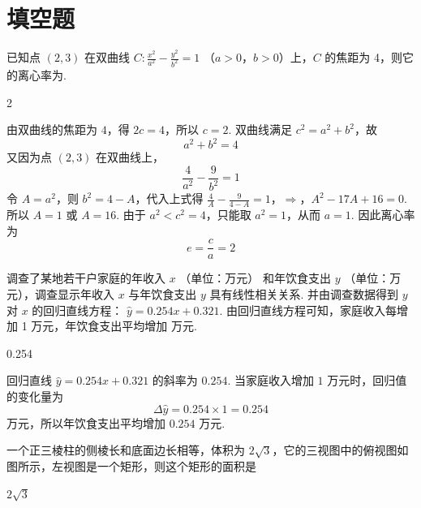 \section{填空题}

\begin{problem}
已知点 \((2,3)\) 在双曲线 \(C: \frac{x^2}{a^2} - \frac{y^2}{b^2} = 1 \) （\(a > 0\)，\(b > 0\)）上，\(C\) 的焦距为 4，则它的离心率为\fillinblank{}.
\end{problem}

\begin{answer}
2
\end{answer}

\begin{solution}
由双曲线的焦距为 \(4\)，得 \(2c=4\)，所以 \(c=2\). 双曲线满足 \(c^{2}=a^{2}+b^{2}\)，故
\[
a^{2}+b^{2}=4
\]
又因为点 \((2,3)\) 在双曲线上，
\[
\frac4{a^{2}}-\frac9{b^{2}}=1
\]
令 \(A=a^{2}\)，则 \(b^{2}=4-A\)，代入上式得
\(\frac4A-\frac9{4-A}=1\)，\(\Longrightarrow\)，\(A^{2}-17A+16=0\).
所以 \(A=1\) 或 \(A=16\). 由于 \(a^{2}<c^{2}=4\)，只能取 \(a^{2}=1\)，从而 \(a=1\). 因此离心率为
\[
e=\frac ca=2
\]
\end{solution}

\begin{problem}
调查了某地若干户家庭的年收入 \(x\) （单位：万元） 和年饮食支出 \(y\) （单位：万元），调查显示年收入 \(x\) 与年饮食支出 \(y\) 具有线性相关关系. 并由调查数据得到 \(y\) 对 \(x\) 的回归直线方程： \(\hat{y} = 0.254x + 0.321\). 由回归直线方程可知，家庭收入每增加 1 万元，年饮食支出平均增加\fillinblank{} 万元.
\end{problem}

\begin{answer}
0.254
\end{answer}

\begin{solution}
回归直线 \(\hat y=0.254x+0.321\) 的斜率为 \(0.254\). 当家庭收入增加 \(1\) 万元时，回归值的变化量为
\[
\Delta\hat y=0.254\times1=0.254
\]
万元，所以年饮食支出平均增加 \(0.254\) 万元.
\end{solution}

\begin{problem}
一个正三棱柱的侧棱长和底面边长相等，体积为 \(2 \sqrt{3}\)，它的三视图中的俯视图如图所示，左视图是一个矩形，则这个矩形的面积是\fillinblank{}

\end{problem}

\begin{answer}
\(2\sqrt{3}\)
\end{answer}

